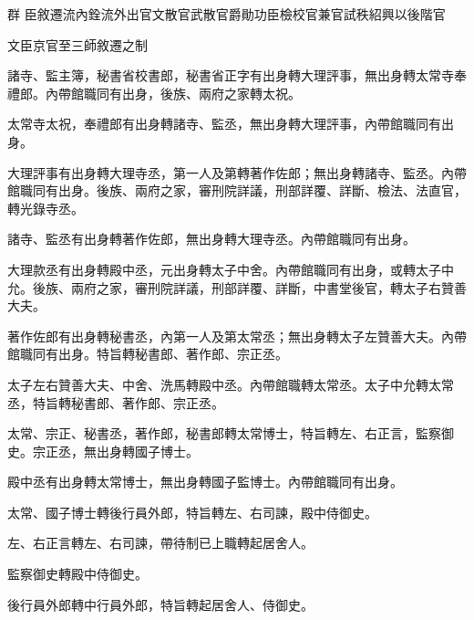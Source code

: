 
\begin{pinyinscope}

 群
 臣敘遷流內銓流外出官文散官武散官爵勛功臣檢校官兼官試秩紹興以後階官



 文臣京官至三師敘遷之制



 諸寺、監主簿，秘書省校書郎，秘書省正字有出身轉大理評事，無出身轉太常寺奉禮郎。內帶館職同有出身，後族、兩府之家轉太祝。



 太常寺太祝，奉禮郎有出身轉諸寺、監丞，無出身轉大理評事，內帶館職同有出身。



 大理評事有出身轉大理寺丞，第一人及第轉著作佐郎；無出身轉諸寺、監丞。內帶館職同有出身。後族、兩府之家，審刑院詳議，刑部詳覆、詳斷、檢法、法直官，轉光錄寺丞。



 諸寺、監丞有出身轉著作佐郎，無出身轉大理寺丞。內帶館職同有出身。



 大理款丞有出身轉殿中丞，元出身轉太子中舍。內帶館職同有出身，或轉太子中允。後族、兩府之家，審刑院詳議，刑部詳覆、詳斷，中書堂後官，轉太子右贊善大夫。



 著作佐郎有出身轉秘書丞，內第一人及第太常丞；無出身轉太子左贊善大夫。內帶館職同有出身。特旨轉秘書郎、著作郎、宗正丞。



 太子左右贊善大夫、中舍、洗馬轉殿中丞。內帶館職轉太常丞。太子中允轉太常丞，特旨轉秘書郎、著作郎、宗正丞。



 太常、宗正、秘書丞，著作郎，秘書郎轉太常博士，特旨轉左、右正言，監察御史。宗正丞，無出身轉國子博士。



 殿中丞有出身轉太常博士，無出身轉國子監博士。內帶館職同有出身。



 太常、國子博士轉後行員外郎，特旨轉左、右司諫，殿中侍御史。



 左、右正言轉左、右司諫，帶待制已上職轉起居舍人。



 監察御史轉殿中侍御史。



 後行員外郎轉中行員外郎，特旨轉起居舍人、侍御史。




\end{pinyinscope}

